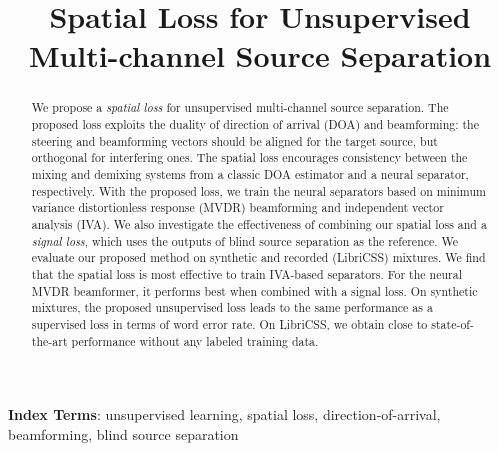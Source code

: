 \documentclass[a4paper]{article}
\title{Spatial Loss for Unsupervised Multi-channel Source Separation}
\begin{document}
\maketitle
% 
\begin{abstract}
We propose a \textit{spatial loss} for unsupervised multi-channel source separation.
The proposed loss exploits the duality of direction of arrival (DOA) and beamforming: the steering and beamforming vectors should be aligned for the target source, but orthogonal for interfering ones.
The spatial loss encourages consistency between the mixing and demixing systems from a classic DOA estimator and a neural separator, respectively.
With the proposed loss, we train the neural separators based on minimum variance distortionless response (MVDR) beamforming and independent vector analysis (IVA).
We also investigate the effectiveness of combining our spatial loss and a \textit{signal loss}, which uses the outputs of blind source separation as the reference.
We evaluate our proposed method on synthetic and recorded (LibriCSS) mixtures.
We find that the spatial loss is most effective to train IVA-based separators.
For the neural MVDR beamformer, it performs best when combined with a signal loss.
On synthetic mixtures, the proposed unsupervised loss leads to the same performance as a supervised loss in terms of word error rate.
On LibriCSS, we obtain close to state-of-the-art performance without any labeled training data.



\end{abstract}
\noindent\textbf{Index Terms}: unsupervised learning, spatial loss, direction-of-arrival, beamforming, blind source separation
\end{document}
